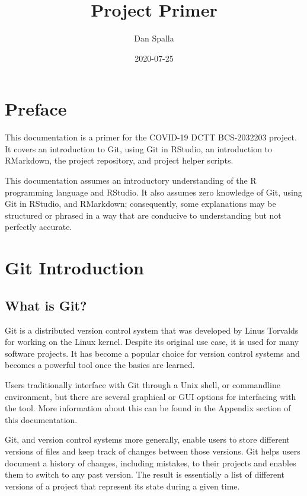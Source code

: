 \documentclass[
]{book}
\title{Project Primer}
\author{Dan Spalla}
\date{2020-07-25}
\begin{document}
\maketitle

{
\setcounter{tocdepth}{1}
\tableofcontents
}
\hypertarget{preface}{%
\chapter*{Preface}\label{preface}}

This documentation is a primer for the COVID-19 DCTT BCS-2032203 project. It covers an introduction to Git, using Git in RStudio, an introduction to RMarkdown, the project repository, and project helper scripts.

This documentation assumes an introductory understanding of the R programming language and RStudio. It also assumes zero knowledge of Git, using Git in RStudio, and RMarkdown; consequently, some explanations may be structured or phrased in a way that are conducive to understanding but not perfectly accurate.

\hypertarget{git-introduction}{%
\chapter{Git Introduction}\label{git-introduction}}

\hypertarget{what-is-git}{%
\section{What is Git?}\label{what-is-git}}

Git is a distributed version control system that was developed by Linus Torvalds for working on the Linux kernel. Despite its original use case, it is used for many software projects. It has become a popular choice for version control systems and becomes a powerful tool once the basics are learned.

Users traditionally interface with Git through a Unix shell, or commandline environment, but there are several graphical or GUI options for interfacing with the tool. More information about this can be found in the Appendix section of this documentation.

Git, and version control systems more generally, enable users to store different versions of files and keep track of changes between those versions. Git helps users document a history of changes, including mistakes, to their projects and enables them to switch to any past version. The result is essentially a list of different versions of a project that represent its state during a given time.
\end{document}

